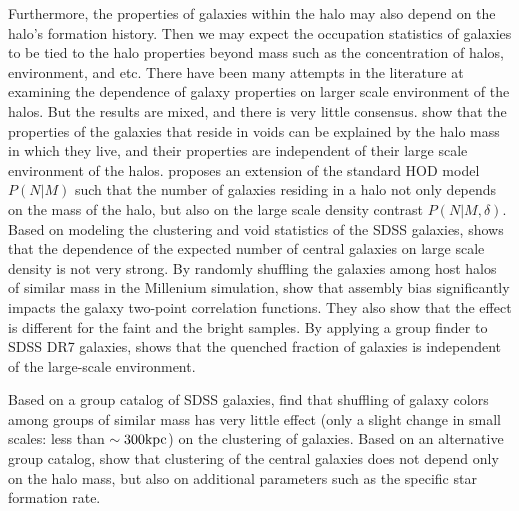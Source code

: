 \documentclass[12pt, preprint]{aastex}
\begin{document}
Furthermore, the properties of galaxies within the halo may also depend on the halo's formation history. Then we may expect the occupation statistics of galaxies to be tied to the halo properties beyond mass such as the concentration of halos, environment, and etc. There have been many attempts in the literature at examining the dependence of galaxy properties on larger scale environment of the halos. But the results are mixed, and there is very little consensus. \citet{tinker_void_2009} show that the properties of the galaxies that reside in voids can be explained by the halo mass in which they live, and their properties are independent of their large scale environment of the halos. \citealt{tinker_density_hod} proposes an extension of the standard HOD model $P(N|M)$ such that the number of galaxies residing in a halo not only depends on the mass of the halo, but also on the large scale density contrast $P(N|M,\delta)$. Based on modeling the clustering and void statistics of the SDSS galaxies, \citealt{tinker_vpf_2008} shows that the dependence of the expected number of central galaxies on large scale density is not very strong.    
By randomly shuffling the galaxies among host halos of similar mass in the Millenium simulation, \citealt{croton2007} show that assembly bias significantly impacts the galaxy two-point correlation functions. They also show that the effect is different for the faint and the bright samples. By applying a group finder to SDSS DR7 galaxies, \citealt{tinker2011} shows that the quenched fraction of galaxies is independent of the large-scale environment. 

Based on a group catalog of SDSS galaxies, \citet{blanton_group_2007} find that shuffling of galaxy colors among groups of similar mass has very little effect (only a slight change in small scales: less than $\sim 300 \rm{kpc}$) on the clustering of galaxies. Based on an alternative group catalog, \citet{wang2013} show that clustering of the central galaxies does not depend only on the halo mass, but also on additional parameters such as the specific star formation rate.
\end{document}

